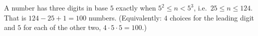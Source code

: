 A number has three digits in base $5$ exactly when $5^2\le n<5^3$, i.e.\ $25\le n\le124$. That is $124-25+1=\boxed{100}$ numbers. (Equivalently: $4$ choices for the leading digit and $5$ for each of the other two, $4\cdot5\cdot5=100$.)
